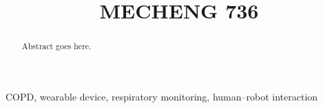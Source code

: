 \documentclass[conference]{IEEEtran}
\title{MECHENG 736 }
\author{
    \IEEEauthorblockN{Riley Parsons, Daniel Aviga, Jerry Chuang, Dylan Parkin}
}
\begin{document}
\maketitle

\begin{abstract}
    Abstract goes here.
\end{abstract}

\begin{IEEEkeywords}
    COPD, wearable device, respiratory monitoring, human--robot interaction
\end{IEEEkeywords}















\end{document}
